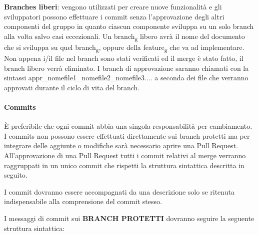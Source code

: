 \noindent \textbf{Branches liberi}:
vengono utilizzati per creare nuove funzionalità e gli sviluppatori possono effettuare i commit senza l'approvazione degli altri componenti del gruppo
in quanto ciascun componente sviluppa su un solo branch alla volta salvo casi eccezionali.
Un branch\textsubscript{g} libero avrà il nome del documento che si sviluppa su quel branch\textsubscript{g}, oppure della feature\textsubscript{g} che va ad implementare.\\
Non appena i/il file nel branch sono stati verificati ed il merge è stato fatto, il branch libero verrà eliminato.
I branch di approvazione saranno chiamati con la sintassi appr\_nomefile1\_nomefile2\_nomefile3.... a seconda dei file che verranno approvati durante il ciclo di vita del branch.
\paragraph{Commits}
È preferibile che ogni commit abbia una singola responsabilità per cambiamento.\\
I commits non possono essere effettuati direttamente sui branch protetti ma per integrare delle aggiunte o modifiche sarà necessario aprire una Pull Request.
All'approvazione di una Pull Request tutti i commit relativi al merge verranno raggruppati in un unico commit che rispetti la struttura sintattica descritta in seguito.

I commit dovranno essere accompagnati da una descrizione solo se ritenuta indispensabile alla comprensione del commit stesso.

I messaggi di commit sui \textbf{\uppercase{branch protetti}} dovranno seguire la seguente struttura sintattica:\\


